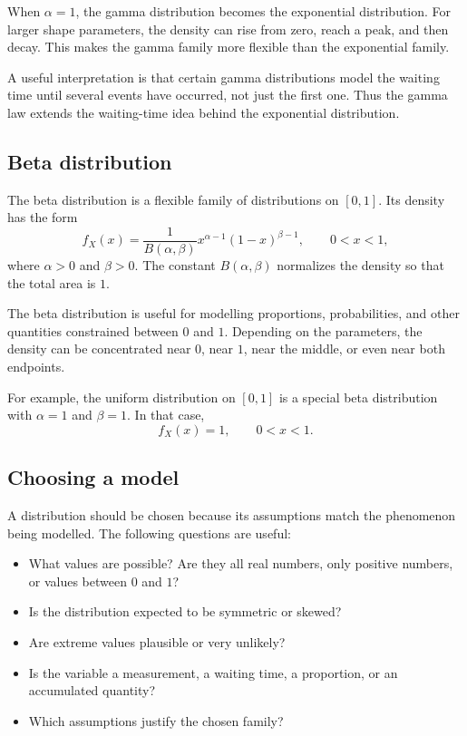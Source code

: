 When \(\alpha=1\), the gamma distribution becomes the exponential distribution.
For larger shape parameters, the density can rise from zero, reach a peak, and
then decay. This makes the gamma family more flexible than the exponential
family.

A useful interpretation is that certain gamma distributions model the waiting
time until several events have occurred, not just the first one. Thus the gamma
law extends the waiting-time idea behind the exponential distribution.

\subsection*{Beta distribution}

The beta distribution is a flexible family of distributions on \([0,1]\). Its
density has the form
\[
f_X(x)=\frac{1}{B(\alpha,\beta)}x^{\alpha-1}(1-x)^{\beta-1},
\qquad 0<x<1,
\]
where \(\alpha>0\) and \(\beta>0\). The constant \(B(\alpha,\beta)\) normalizes
the density so that the total area is \(1\).

The beta distribution is useful for modelling proportions, probabilities, and
other quantities constrained between \(0\) and \(1\). Depending on the parameters,
the density can be concentrated near \(0\), near \(1\), near the middle, or even
near both endpoints.

For example, the uniform distribution on \([0,1]\) is a special beta
distribution with \(\alpha=1\) and \(\beta=1\). In that case,
\[
f_X(x)=1,
\qquad 0<x<1.
\]

\subsection*{Choosing a model}

A distribution should be chosen because its assumptions match the phenomenon
being modelled. The following questions are useful:
\begin{itemize}
    \item What values are possible? Are they all real numbers, only positive
    numbers, or values between \(0\) and \(1\)?
    \item Is the distribution expected to be symmetric or skewed?
    \item Are extreme values plausible or very unlikely?
    \item Is the variable a measurement, a waiting time, a proportion, or an
    accumulated quantity?
    \item Which assumptions justify the chosen family?
\end{itemize}

